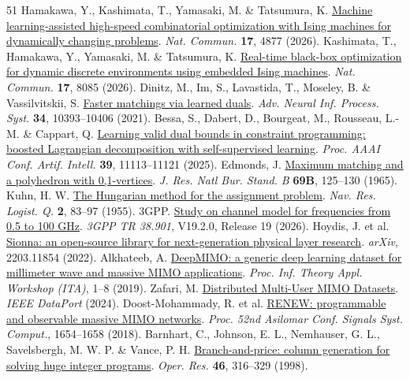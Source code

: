 \documentclass[10pt,letterpaper]{article}
\begin{document}
\begin{thebibliography}{51}
 Hamakawa, Y., Kashimata, T., Yamasaki, M. \& Tatsumura, K. \href{https://doi.org/10.1038/s41467-026-73725-6}{Machine learning-assisted high-speed combinatorial optimization with Ising machines for dynamically changing problems}. \emph{Nat. Commun.} \textbf{17}, 4877 (2026).
 Kashimata, T., Hamakawa, Y., Yamasaki, M. \& Tatsumura, K. \href{https://doi.org/10.1038/s41467-026-76069-3}{Real-time black-box optimization for dynamic discrete environments using embedded Ising machines}. \emph{Nat. Commun.} \textbf{17}, 8085 (2026).
 Dinitz, M., Im, S., Lavastida, T., Moseley, B. \& Vassilvitskii, S. \href{https://proceedings.neurips.cc/paper/2021/hash/5616060fb8ae85d93f334e7267307664-Abstract.html}{Faster matchings via learned duals}. \emph{Adv. Neural Inf. Process. Syst.} \textbf{34}, 10393–10406 (2021).
 Bessa, S., Dabert, D., Bourgeat, M., Rousseau, L.-M. \& Cappart, Q. \href{https://doi.org/10.1609/aaai.v39i11.33208}{Learning valid dual bounds in constraint programming: boosted Lagrangian decomposition with self-supervised learning}. \emph{Proc. AAAI Conf. Artif. Intell.} \textbf{39}, 11113–11121 (2025).
 Edmonds, J. \href{https://doi.org/10.6028/jres.069B.013}{Maximum matching and a polyhedron with 0,1-vertices}. \emph{J. Res. Natl Bur. Stand. B} \textbf{69B}, 125–130 (1965).
 Kuhn, H. W. \href{https://doi.org/10.1002/nav.3800020109}{The Hungarian method for the assignment problem}. \emph{Nav. Res. Logist. Q.} \textbf{2}, 83–97 (1955).
 3GPP. \href{https://www.etsi.org/deliver/etsi_tr/138900_138999/138901/19.02.00_60/tr_138901v190200p.pdf}{Study on channel model for frequencies from 0.5 to 100 GHz}. \emph{3GPP TR 38.901}, V19.2.0, Release 19 (2026).
 Hoydis, J. et al. \href{https://doi.org/10.48550/arXiv.2203.11854}{Sionna: an open-source library for next-generation physical layer research}. \emph{arXiv}, 2203.11854 (2022).
 Alkhateeb, A. \href{https://arxiv.org/abs/1902.06435}{DeepMIMO: a generic deep learning dataset for millimeter wave and massive MIMO applications}. \emph{Proc. Inf. Theory Appl. Workshop (ITA)}, 1–8 (2019).
 Zafari, M. \href{https://doi.org/10.21227/74ez-b275}{Distributed Multi-User MIMO Datasets}. \emph{IEEE DataPort} (2024).
 Doost-Mohammady, R. et al. \href{https://doi.org/10.1109/ACSSC.2018.8645391}{RENEW: programmable and observable massive MIMO networks}. \emph{Proc. 52nd Asilomar Conf. Signals Syst. Comput.}, 1654–1658 (2018).
 Barnhart, C., Johnson, E. L., Nemhauser, G. L., Savelsbergh, M. W. P. \& Vance, P. H. \href{https://doi.org/10.1287/opre.46.3.316}{Branch-and-price: column generation for solving huge integer programs}. \emph{Oper. Res.} \textbf{46}, 316–329 (1998).

\end{thebibliography}
\end{document}
